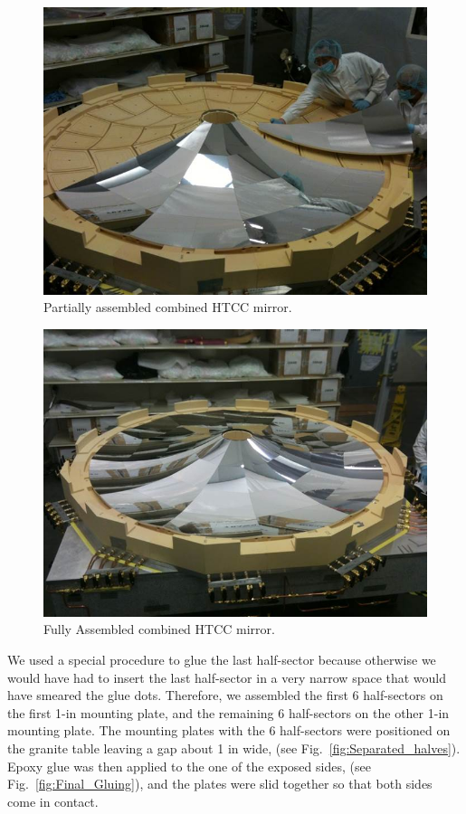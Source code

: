  \begin{figure}[ht]
    \centering
    \includegraphics[width=1.0\linewidth]{images/Partial_Assembl_MIR.jpg}
    \caption{ Partially assembled combined HTCC mirror.}
    \label{fig:Partial_Assembl_MIR}
\end{figure}

 \begin{figure}[ht]
    \centering
    \includegraphics[width=1.0\linewidth]{images/Compl_Assembl_MIR.jpg}
    \caption{Fully Assembled combined HTCC mirror.}
    \label{fig:Compl_Assembl_MIR}
\end{figure}

We used a special procedure to glue the last half-sector because otherwise we would have had to insert the last
half-sector in a very narrow space that would have smeared the glue dots. Therefore, we assembled the first 6
half-sectors on the first 1-in mounting plate, and the remaining 6 half-sectors on the other 1-in mounting plate.
The mounting plates with the 6 half-sectors were positioned on the granite table leaving a gap about 1 in wide,
(see Fig.~\ref{fig:Separated_halves}). Epoxy glue was then applied to the one of the exposed sides, (see
Fig.~\ref{fig:Final_Gluing}), and the plates were slid together so that both sides come in contact.
 
